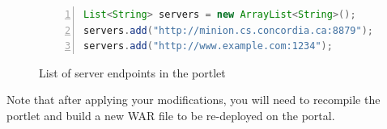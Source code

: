 \begin{figure}[h!]
\centering
\begin{lstlisting}[language=Java,numbers=left,xleftmargin=4mm,columns=flexible]
List<String> servers = new ArrayList<String>();
servers.add("http://minion.cs.concordia.ca:8879");
servers.add("http://www.example.com:1234");
\end{lstlisting}
\caption{List of \sa server endpoints in the portlet}
\label{list:portal_server_addresses}
\end{figure}

Note that after applying your modifications, you will need to recompile the portlet and build a new WAR file to be re-deployed on the portal.

\label{sec:server_change}